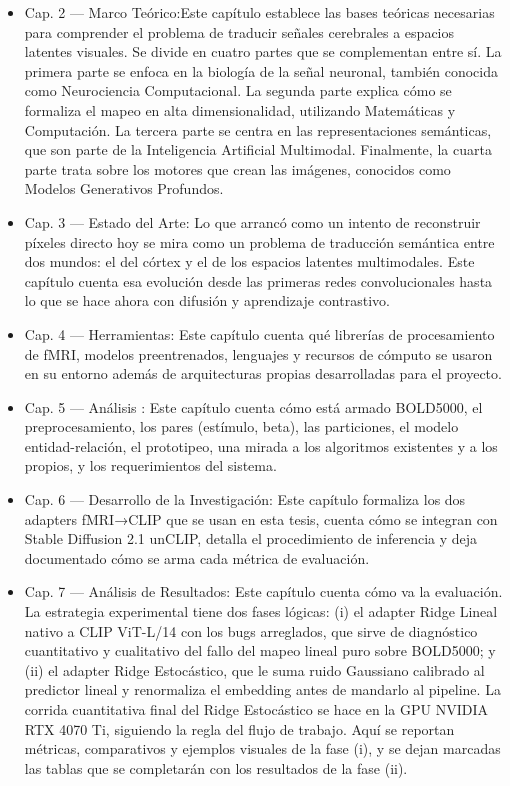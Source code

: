 \begin{itemize}
\item Cap. 2 --- Marco Teórico:Este capítulo establece las bases teóricas necesarias para 
comprender el problema de traducir señales cerebrales a espacios latentes visuales.
Se divide en cuatro partes que se complementan entre sí. La primera parte se enfoca en la 
biología de la señal neuronal, también conocida como Neurociencia Computacional.
La segunda parte explica cómo se formaliza el mapeo en alta dimensionalidad, utilizando 
Matemáticas y Computación.
La tercera parte se centra en las representaciones semánticas, que son parte de la 
Inteligencia Artificial Multimodal.
Finalmente, la cuarta parte trata sobre los motores que crean las imágenes, conocidos 
como Modelos Generativos Profundos.

\item Cap. 3 --- Estado del Arte: Lo que arrancó como un intento de reconstruir
píxeles directo hoy se mira como un problema de traducción semántica entre
dos mundos: el del córtex y el de los espacios latentes multimodales. Este
capítulo cuenta esa evolución desde las primeras redes convolucionales hasta
lo que se hace ahora con difusión y aprendizaje contrastivo.

\item Cap. 4 --- Herramientas: Este capítulo cuenta qué librerías de procesamiento de fMRI, 
modelos preentrenados, lenguajes y recursos de cómputo se usaron en su entorno además de
arquitecturas propias desarrolladas para el proyecto.

\item Cap. 5 --- Análisis : Este capítulo cuenta cómo está armado BOLD5000, el preprocesamiento, 
los pares (estímulo, beta), las particiones, el modelo entidad-relación, el prototipeo, una 
mirada a los algoritmos existentes y a los propios, y los requerimientos del sistema.

\item Cap. 6 --- Desarrollo de la Investigación: Este capítulo formaliza los dos adapters fMRI→CLIP que se usan en 
esta tesis, cuenta cómo se integran con Stable Diffusion 2.1 unCLIP, detalla el procedimiento 
de inferencia y deja documentado cómo se arma cada métrica de evaluación. 

\item Cap. 7 --- Análisis de Resultados: Este capítulo cuenta cómo va la evaluación. 
La estrategia experimental tiene dos fases lógicas: (i) el adapter Ridge Lineal nativo a 
CLIP ViT-L/14 con los bugs arreglados, que sirve de diagnóstico cuantitativo y cualitativo 
del fallo del mapeo lineal puro sobre BOLD5000; y (ii) el adapter Ridge Estocástico, que le 
suma ruido Gaussiano calibrado al predictor lineal y renormaliza el embedding antes de mandarlo 
al pipeline. La corrida cuantitativa final del Ridge Estocástico se hace en la GPU NVIDIA RTX 
4070 Ti, siguiendo la regla del flujo de trabajo. Aquí se reportan métricas, comparativos y 
ejemplos visuales de la fase (i), y se dejan marcadas las tablas que se completarán con los 
resultados de la fase (ii).


\end{itemize}
